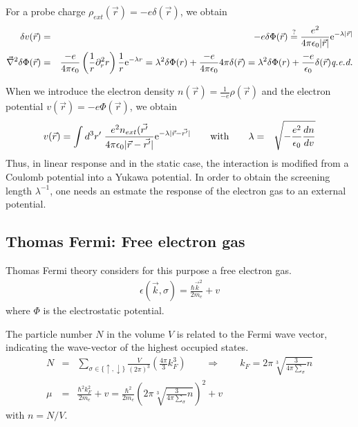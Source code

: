 \documentclass[11pt,a4paper]{report}
\begin{document}
For a probe charge $\rho_{ext}(\vec{r})=-e\delta(\vec{r})$, we obtain
\begin{eqnarray}
\delta v(\vec{r})
&=&-e\delta\Phi(\vec{r})\stackrel{?}{=}
\frac{e^2}{4\pi\epsilon_0|\vec{r}|}\mathrm{e}^{-\lambda|\vec{r}|}
\\
\vec{\nabla}^2\delta\Phi(\vec{r})
&=&\frac{-e}{4\pi\epsilon_0}
\left(\frac{1}{r}\partial_r^2r\right)
\frac{1}{r}\mathrm{e}^{-\lambda r}
=\lambda^2\delta\Phi(r)+
\frac{-e}{4\pi\epsilon_0} 4\pi\delta(\vec{r})
=\lambda^2\delta\Phi(r)+
\frac{-e}{\epsilon_0}\delta(\vec{r})
\textit{q.e.d.}\nonumber
\end{eqnarray}

When we introduce the electron density
$n(\vec{r})=\frac{1}{-e}\rho(\vec{r})$ and the electron potential
$v(\vec{r})=-e\Phi(\vec{r})$, we obtain
\begin{eqnarray}
v(\vec{r})=\int d^3r'\;
\frac{e^2 n_{ext}(\vec{r'}}{4\pi\epsilon_0|\vec{r}-\vec{r'}|}
\mathrm{e}^{-\lambda |\vec{r}-\vec{r'}|}
\qquad\text{with}\qquad
\lambda&=&\sqrt{-\frac{e^2}{\epsilon_0}\frac{dn}{dv}}
\end{eqnarray}
Thus, in linear response and in the static case, the interaction is
modified from a Coulomb potential into a Yukawa potential.  In order
to obtain the screening length $\lambda^{-1}$, one needs an estmate
the response of the electron gas to an external potential.

\subsection{Thomas Fermi: Free electron gas}
Thomas Fermi theory considers for this purpose a free electron gas.
\begin{eqnarray}
\epsilon(\vec{k},\sigma)=\frac{\hbar\vec{k}^2}{2m_e}+v
\end{eqnarray}
where $\Phi$ is the electrostatic potential.

The particle number $N$ in the volume $V$ is related to the Fermi wave
vector, indicating the wave-vector of the highest occupied states.
\begin{eqnarray}
N&=&\sum_{\sigma\in\{\uparrow,\downarrow\}} \frac{V}{(2\pi)^3}\left(\frac{4\pi}{3}k_F^3\right)
\qquad\Rightarrow\qquad
k_F=2\pi\sqrt[3]{\frac{3}{4\pi\sum_\sigma}n}
\nonumber\\
\mu&=&\frac{\hbar^2k_F^2}{2m_e}+v
=\frac{\hbar^2}{2m_e}
\left(2\pi\sqrt[3]{\frac{3}{4\pi\sum_\sigma}n}\right)^2+v
\end{eqnarray}
with $n=N/V$.
\end{document}
